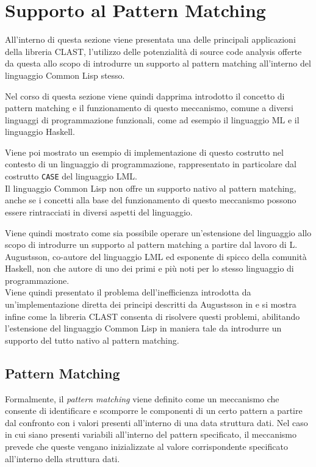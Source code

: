\section{Supporto al Pattern Matching}
\label{pattern-matching}

All'interno di questa sezione viene presentata una delle principali applicazioni
della libreria CLAST, l'utilizzo delle potenzialità di source code analysis
offerte da questa allo scopo di introdurre un supporto al pattern matching
all'interno del linguaggio Common Lisp stesso.

Nel corso di questa sezione viene quindi dapprima introdotto il concetto di
pattern matching e il funzionamento di questo meccanismo, comune a diversi
linguaggi di programmazione funzionali, come ad esempio il linguaggio ML e il
linguaggio Haskell.

Viene poi mostrato un esempio di implementazione di questo costrutto nel
contesto di un linguaggio di programmazione, rappresentato in particolare dal
costrutto \texttt{CASE} del linguaggio LML.\\

Il linguaggio Common Lisp non offre un supporto nativo al pattern matching,
anche se i concetti alla base del funzionamento di questo meccanismo possono
essere rintracciati in diversi aspetti del linguaggio.

Viene quindi mostrato come sia possibile operare un'estensione del linguaggio
allo scopo di introdurre un supporto al pattern matching a partire dal lavoro di
L. Augustsson, co-autore del linguaggio LML ed esponente di spicco della
comunità Haskell, non che autore di uno dei primi e più noti per lo stesso
linguaggio di programmazione.\\

Viene quindi presentato il problema dell'inefficienza introdotta da
un'implementazione diretta dei principi descritti da Augustsson in
\cite{DBLP:conf/lfp/Augustsson84} e si mostra infine come la libreria CLAST
consenta di risolvere questi problemi, abilitando l'estensione del linguaggio
Common Lisp in maniera tale da introdurre un supporto del tutto nativo al
pattern matching.

\subsection{Pattern Matching}

Formalmente, il \textit{pattern matching} viene definito come un meccanismo che
consente di identificare e scomporre le componenti di un certo pattern a partire
dal confronto con i valori presenti all’interno di una data struttura dati. Nel
caso in cui siano presenti variabili all’interno del pattern specificato, il
meccanismo prevede che queste vengano inizializzate al valore corrispondente
specificato all’interno della struttura dati.\\

